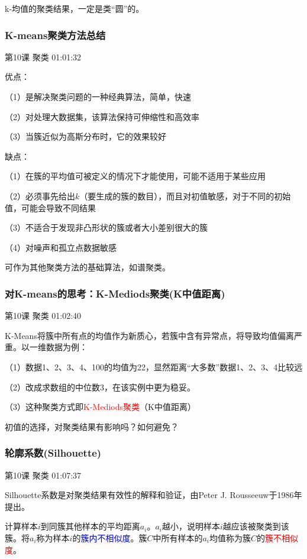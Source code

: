 \documentclass[UTF8]{ctexart}
\begin{document}
k-均值的聚类结果，一定是类“圆”的。

\subsubsection{K-means聚类方法总结}

第10课 聚类 01:01:32

优点：

（1）是解决聚类问题的一种经典算法，简单，快速

（2）对处理大数据集，该算法保持可伸缩性和高效率

（3）当簇近似为高斯分布时，它的效果较好

缺点：

（1）在簇的平均值可被定义的情况下才能使用，可能不适用于某些应用

（2）必须事先给出$k$（要生成的簇的数目），而且对初值敏感，对于不同的初始值，可能会导致不同结果

（3）不适合于发现非凸形状的簇或者大小差别很大的簇

（4）对噪声和孤立点数据敏感

可作为其他聚类方法的基础算法，如谱聚类。

\subsubsection{对K-means的思考：K-Mediods聚类(K中值距离)}

第10课 聚类 01:02:40

K-Means将簇中所有点的均值作为新质心，若簇中含有异常点，将导致均值偏离严重。以一维数据为例：

（1）数据1、2、3、4、100的均值为22，显然距离“大多数”数据1、2、3、4比较远

（2）改成求数组的中位数3，在该实例中更为稳妥。

（3）这种聚类方式即\textcolor{red}{K-Mediods聚类}（K中值距离）

初值的选择，对聚类结果有影响吗？如何避免？

\subsubsection{轮廓系数(Silhouette)}

第10课 聚类 01:07:37

Silhouette系数是对聚类结果有效性的解释和验证，由Peter J. Rousseeuw于1986年提出。

计算样本$i$到同簇其他样本的平均距离$a_{i}$。$a_{i}$越小，说明样本$i$越应该被聚类到该簇。将$a_{i}$称为样本$i$的\textcolor{blue}{簇内不相似度}。簇$C$中所有样本的$a_{i}$均值称为簇$C$的\textcolor{red}{簇不相似度}。
\end{document}
